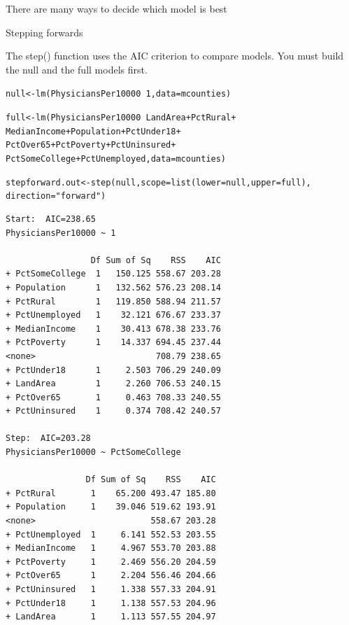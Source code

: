 \documentclass{beamer}\usepackage[]{graphicx}\usepackage[]{color}
\makeatletter
\newcommand{\hlnum}[1]{\textcolor[rgb]{0.824,0.412,0.118}{#1}}%
\newcommand{\hlstr}[1]{\textcolor[rgb]{1,0.894,0.71}{#1}}%
\newcommand{\hlopt}[1]{\textcolor[rgb]{1,0.894,0.769}{#1}}%
\newcommand{\hlstd}[1]{\textcolor[rgb]{1,0.894,0.769}{#1}}%
\newcommand{\hlkwb}[1]{\textcolor[rgb]{0.804,0.776,0.451}{#1}}%
\newcommand{\hlkwc}[1]{\textcolor[rgb]{0.78,0.941,0.545}{#1}}%
\newcommand{\hlkwd}[1]{\textcolor[rgb]{1,0.78,0.769}{#1}}%
\newenvironment{kframe}{%
 \def\at@end@of@kframe{}%
 \ifinner\ifhmode%
  \def\at@end@of@kframe{\end{minipage}}%
  \begin{minipage}{\columnwidth}%
 \fi\fi%
 \def\FrameCommand##1{\hskip\@totalleftmargin \hskip-\fboxsep
 \colorbox{shadecolor}{##1}\hskip-\fboxsep
     \hskip-\linewidth \hskip-\@totalleftmargin \hskip\columnwidth}%
 \MakeFramed {\advance\hsize-\width
   \@totalleftmargin\z@ \linewidth\hsize
   \@setminipage}}%
 {\par\unskip\endMakeFramed%
 \at@end@of@kframe}
\newenvironment{knitrout}{}{} %
\makeatother
\begin{document}
\begin{darkframes}
\begin{frame}[fragile]{There are many ways to decide which model is best}
      \lc  
    \end{frame}  

    \begin{frame}[fragile]{Stepping forwards}

       The step() function uses the AIC criterion to compare models. You must build the null and the full models first.

\begin{knitrout}
\begin{kframe}
\begin{alltt}
\hlstd{null} \hlkwb{<-} \hlkwd{lm}\hlstd{(PhysiciansPer10000}\hlopt{~}\hlnum{1}\hlstd{,} \hlkwc{data}\hlstd{=mcounties)}

\hlstd{full} \hlkwb{<-} \hlkwd{lm}\hlstd{(PhysiciansPer10000} \hlopt{~} \hlstd{LandArea}\hlopt{+}\hlstd{PctRural}\hlopt{+}
           \hlstd{MedianIncome}\hlopt{+}\hlstd{Population}\hlopt{+}\hlstd{PctUnder18}\hlopt{+}
           \hlstd{PctOver65}\hlopt{+}\hlstd{PctPoverty}\hlopt{+}\hlstd{PctUninsured}\hlopt{+}
           \hlstd{PctSomeCollege}\hlopt{+}\hlstd{PctUnemployed,} \hlkwc{data}\hlstd{=mcounties)}

\hlstd{stepforward.out} \hlkwb{<-} \hlkwd{step}\hlstd{(null,} \hlkwc{scope}\hlstd{=}\hlkwd{list}\hlstd{(}\hlkwc{lower}\hlstd{=null,} \hlkwc{upper}\hlstd{=full),}
                              \hlkwc{direction} \hlstd{=}\hlstr{"forward"}\hlstd{)}
\end{alltt}
\begin{verbatim}
Start:  AIC=238.65
PhysiciansPer10000 ~ 1

                 Df Sum of Sq    RSS    AIC
+ PctSomeCollege  1   150.125 558.67 203.28
+ Population      1   132.562 576.23 208.14
+ PctRural        1   119.850 588.94 211.57
+ PctUnemployed   1    32.121 676.67 233.37
+ MedianIncome    1    30.413 678.38 233.76
+ PctPoverty      1    14.337 694.45 237.44
<none>                        708.79 238.65
+ PctUnder18      1     2.503 706.29 240.09
+ LandArea        1     2.260 706.53 240.15
+ PctOver65       1     0.463 708.33 240.55
+ PctUninsured    1     0.374 708.42 240.57

Step:  AIC=203.28
PhysiciansPer10000 ~ PctSomeCollege

                Df Sum of Sq    RSS    AIC
+ PctRural       1    65.200 493.47 185.80
+ Population     1    39.046 519.62 193.91
<none>                       558.67 203.28
+ PctUnemployed  1     6.141 552.53 203.55
+ MedianIncome   1     4.967 553.70 203.88
+ PctPoverty     1     2.469 556.20 204.59
+ PctOver65      1     2.204 556.46 204.66
+ PctUninsured   1     1.338 557.33 204.91
+ PctUnder18     1     1.138 557.53 204.96
+ LandArea       1     1.113 557.55 204.97


\end{verbatim}
\end{kframe}
\end{knitrout}
\end{frame}
\end{darkframes}
\end{document}
